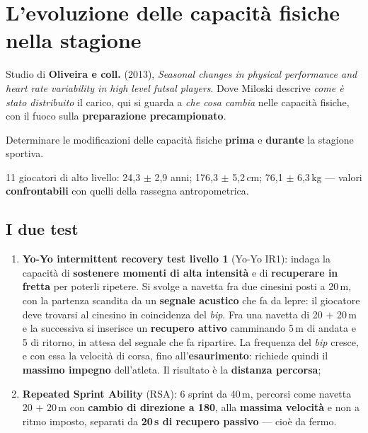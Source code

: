 \section{L'evoluzione delle capacità fisiche nella stagione}

Studio di \textbf{Oliveira e coll.} (2013), \textit{Seasonal changes in physical performance and
heart rate variability in high level futsal players}. Dove Miloski descrive \textit{come è stato
distribuito} il carico, qui si guarda a \textit{che cosa cambia} nelle capacità fisiche, con il
fuoco sulla \textbf{preparazione precampionato}.

Determinare le modificazioni delle capacità fisiche \textbf{prima} e \textbf{durante} la stagione
sportiva.

11 giocatori di alto livello: 24,3 $\pm$ 2,9 anni; 176,3 $\pm$ 5,2\,cm; 76,1 $\pm$ 6,3\,kg ---
valori \textbf{confrontabili} con quelli della rassegna antropometrica.

\subsection{I due test}

\begin{enumerate}
  \item \textbf{Yo-Yo intermittent recovery test livello 1} (Yo-Yo IR1): indaga la capacità di
    \textbf{sostenere momenti di alta intensità} e di \textbf{recuperare in fretta} per poterli
    ripetere. Si svolge a navetta fra due cinesini posti a 20\,m, con la partenza scandita da un
    \textbf{segnale acustico} che fa da lepre: il giocatore deve trovarsi al cinesino in coincidenza
    del \textit{bip}. Fra una navetta di 20 $+$ 20\,m e la successiva si inserisce un
    \textbf{recupero attivo} camminando 5\,m di andata e 5 di ritorno, in attesa del segnale che fa
    ripartire. La frequenza del \textit{bip} cresce, e con essa la velocità di corsa, fino
    all'\textbf{esaurimento}: richiede quindi il \textbf{massimo impegno} dell'atleta. Il risultato
    è la \textbf{distanza percorsa};
  \item \textbf{Repeated Sprint Ability} (RSA): 6 sprint da 40\,m, percorsi come navetta
    20 $+$ 20\,m con \textbf{cambio di direzione a 180\textdegree}, alla \textbf{massima velocità}
    e non a ritmo imposto, separati da \textbf{20\,s di recupero passivo} --- cioè da fermo.
\end{enumerate}

